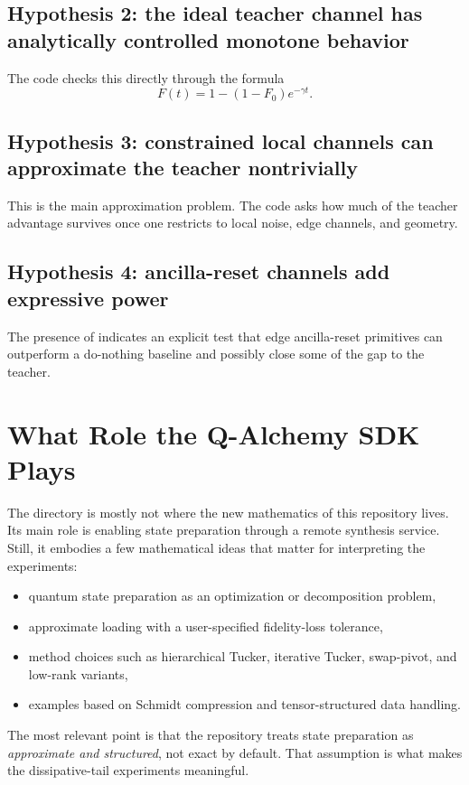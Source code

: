 \documentclass[11pt,a4paper]{article}
\begin{document}
\subsection*{Hypothesis 2: the ideal teacher channel has analytically controlled monotone behavior}
The code checks this directly through the formula
\[
F(t)=1-(1-F_0)e^{-\gamma t}.
\]

\subsection*{Hypothesis 3: constrained local channels can approximate the teacher nontrivially}
This is the main approximation problem. The code asks how much of the teacher advantage survives once one restricts to local noise, edge channels, and geometry.

\subsection*{Hypothesis 4: ancilla-reset channels add expressive power}
The presence of  indicates an explicit test that edge ancilla-reset primitives can outperform a do-nothing baseline and possibly close some of the gap to the teacher.

\section{What Role the Q-Alchemy SDK Plays}
The directory  is mostly not where the new mathematics of this repository lives. Its main role is enabling state preparation through a remote synthesis service. Still, it embodies a few mathematical ideas that matter for interpreting the experiments:
\begin{itemize}
  \item quantum state preparation as an optimization or decomposition problem,
  \item approximate loading with a user-specified fidelity-loss tolerance,
  \item method choices such as hierarchical Tucker, iterative Tucker, swap-pivot, and low-rank variants,
  \item examples based on Schmidt compression and tensor-structured data handling.
\end{itemize}

The most relevant point is that the repository treats state preparation as \emph{approximate and structured}, not exact by default. That assumption is what makes the dissipative-tail experiments meaningful.
\end{document}
